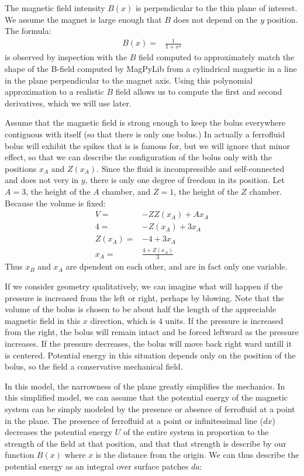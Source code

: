 \documentclass{asme2ej}
\begin{document}
The magnetic field intensity $B(x)$ is perpendicular to the thin plane of interest.
We assume the magnet is large enough that $B$ does not depend on the $y$ position.
The formula:
\begin{align}
  B(x) =& \frac{1}{1+x^4}
\end{align}
is observed by inspection with the $B$ field computed to approximately match the shape of the B-field computed
by MagPyLib from a cylindrical magnetic in a line in the plane perpendicular to the magnet axis.
Using this polynomial approximation to a realistic $B$ field allows us to compute the
first and second derivatives, which we will use later.


Assume that the magnetic field is strong enough to keep the bolus everywhere
contiguous with itself (so that there is only one bolus.)
In actually a ferrofluid bolus will exhibit the spikes that is is famous for, but
we will ignore that minor effect,
so that we can
describe the configuration of the bolus only with the positions $x_A$ and $Z(x_A)$.
Since the fluid is incompressible and self-connected and does not very in $y$, there
is only one degree of freedom in its position.
Let $A = 3$,  the height of the $A$ chamber, and $Z = 1$, the height of the $Z$ chamber.
Because the volume is fixed:
\begin{align}
  V = & -Z Z(x_A) + Ax_A \\
  4 = & -Z(x_A) + 3x_A \\
  Z(x_A) = & -4 + 3x_A \\
  x_A = & \frac{4 + Z(x_A)}{3}
  \label{eqn:yvalue}
\end{align}
Thus $x_B$ and $x_A$ are dpendent on each other, and are in fact only one variable.

If we consider geometry qualitatively, we can imagine what will happen
if the pressure is increased from the left or right, perhaps by blowing.
Note that the volume of the bolus is chosen to be about
half the length
of the appreciable magnetic field in this $x$ direction, which is $4$ units.
If the pressure is increased from the right, the bolus will remain intact
and be forced leftward as the pressure increases. If the pressure decreases,
the bolus will move back right ward untill it is centered.
Potential energy in this situation depends only on the position of the bolus,
so the field a conservative mechanical field.


In this model, the narrowness of the plane greatly simplifies the mechanics.
In this simplified model, we can assume
that the potential energy of the magnetic system can be simply
modeled by the presence or absence of ferrofluid at a point in the plane.
The presence of ferrofluid at a point or infinitessimal line ($dx$) decreases the potential energy $U$
of the entire system in proportion to the strength of the field at that position,
and that that strength is describe by our function $B(x)$ where $x$ is the
distance from the origin.
We can thus describe the potential energy as an integral over surface patches $da$:
\end{document}
